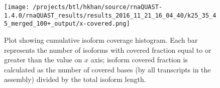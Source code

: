 \documentclass[12pt,a4paper]{article}
\begin{document}
\begin{figure}[t]
\centering
\texttt{[image: /projects/btl/hkhan/source/rnaQUAST-1.4.0/rnaQUAST\_results/results\_2016\_11\_21\_16\_04\_40/k25\_35\_45\_merged\_100+\_output/x-covered.png]}
\caption{Plot showing cumulative isoform coverage histogram. Each bar represents the number of isoforms with covered fraction equal to or greater than the value on $x$ axis; isoform covered fraction is calculated as the number of covered bases (by all transcripts in the assembly) divided by the total isoform length.}
\end{figure}
\FloatBarrier
\clearpage
\end{document}

